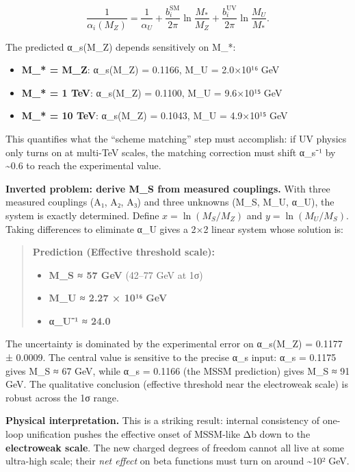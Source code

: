 \documentclass[
]{article}
\providecommand{\tightlist}{%
  \setlength{\itemsep}{0pt}\setlength{\parskip}{0pt}}
\begin{document}
\[
\frac{1}{\alpha_i(M_Z)} = \frac{1}{\alpha_U} + \frac{b_i^\mathrm{SM}}{2\pi}
\ln\frac{M_\ast}{M_Z} + \frac{b_i^\mathrm{UV}}{2\pi}\ln\frac{M_U}{M_\ast}.
\]

The predicted α\_s(M\_Z) depends sensitively on M\_*:

\begin{itemize}
\tightlist
\item
  \textbf{M\_* = M\_Z}: α\_s(M\_Z) = 0.1166, M\_U = 2.0×10¹⁶ GeV
\item
  \textbf{M\_* = 1 TeV}: α\_s(M\_Z) = 0.1100, M\_U = 9.6×10¹⁵ GeV
\item
  \textbf{M\_* = 10 TeV}: α\_s(M\_Z) = 0.1043, M\_U = 4.9×10¹⁵ GeV
\end{itemize}

This quantifies what the ``scheme matching'' step must accomplish: if UV
physics only turns on at multi-TeV scales, the matching correction must
shift α\_s⁻¹ by \textasciitilde0.6 to reach the experimental value.

\textbf{Inverted problem: derive M\_S from measured couplings.} With
three measured couplings (A₁, A₂, A₃) and three unknowns (M\_S, M\_U,
α\_U), the system is exactly determined. Define \(x = \ln(M_S/M_Z)\) and
\(y = \ln(M_U/M_S)\). Taking differences to eliminate α\_U gives a 2×2
linear system whose solution is:

\begin{quote}
\textbf{Prediction (Effective threshold scale):}

\begin{itemize}
\tightlist
\item
  \textbf{M\_S ≈ 57 GeV} (42--77 GeV at 1σ)
\item
  \textbf{M\_U ≈ 2.27 × 10¹⁶ GeV}
\item
  \textbf{α\_U⁻¹ ≈ 24.0}
\end{itemize}
\end{quote}

The uncertainty is dominated by the experimental error on α\_s(M\_Z) =
0.1177 ± 0.0009. The central value is sensitive to the precise α\_s
input: α\_s = 0.1175 gives M\_S ≈ 67 GeV, while α\_s = 0.1166 (the MSSM
prediction) gives M\_S ≈ 91 GeV. The qualitative conclusion (effective
threshold near the electroweak scale) is robust across the 1σ range.

\textbf{Physical interpretation.} This is a striking result: internal
consistency of one-loop unification pushes the effective onset of
MSSM-like Δb down to the \textbf{electroweak scale}. The new charged
degrees of freedom cannot all live at some ultra-high scale; their
\emph{net effect} on beta functions must turn on around
\textasciitilde10² GeV.
\end{document}

